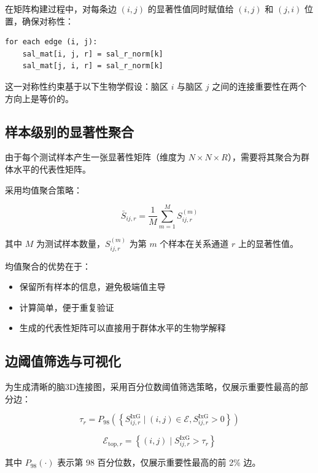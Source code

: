\documentclass[UTF8, a4paper, 12pt]{article}
\begin{document}
在矩阵构建过程中，对每条边 $(i, j)$ 的显著性值同时赋值给 $(i, j)$ 和 $(j, i)$ 位置，确保对称性：

\begin{verbatim}
for each edge (i, j):
    sal_mat[i, j, r] = sal_r_norm[k]
    sal_mat[j, i, r] = sal_r_norm[k]
\end{verbatim}

这一对称性约束基于以下生物学假设：脑区 $i$ 与脑区 $j$ 之间的连接重要性在两个方向上是等价的。

\subsection{样本级别的显著性聚合}

由于每个测试样本产生一张显著性矩阵（维度为 $N \times N \times R$），需要将其聚合为群体水平的代表性矩阵。

采用均值聚合策略：

\begin{equation}
\bar{S}_{ij,r} = \frac{1}{M} \sum_{m=1}^{M} S_{ij,r}^{(m)}
\end{equation}

其中 $M$ 为测试样本数量，$S_{ij,r}^{(m)}$ 为第 $m$ 个样本在关系通道 $r$ 上的显著性值。

均值聚合的优势在于：
\begin{itemize}
    \item 保留所有样本的信息，避免极端值主导
    \item 计算简单，便于重复验证
    \item 生成的代表性矩阵可以直接用于群体水平的生物学解释
\end{itemize}

\subsection{边阈值筛选与可视化}

为生成清晰的脑3D连接图，采用百分位数阈值筛选策略，仅展示重要性最高的部分边：

\begin{equation}
\tau_r = P_{98}\left( \left\{ S_{ij,r}^{\text{IxG}} \mid (i,j) \in \mathcal{E}, S_{ij,r}^{\text{IxG}} > 0 \right\} \right)
\end{equation}

\begin{equation}
\mathcal{E}_{\text{top},r} = \left\{ (i,j) \mid S_{ij,r}^{\text{IxG}} > \tau_r \right\}
\end{equation}

其中 $P_{98}(\cdot)$ 表示第 98 百分位数，仅展示重要性最高的前 2\% 边。
\end{document}

